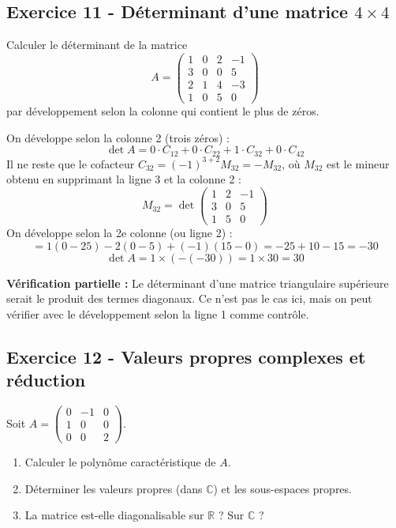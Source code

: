 \documentclass[12pt,a4paper]{article}
\begin{document}
\subsection*{Exercice 11 - Déterminant d'une matrice $4\times4$ \niveau{\difficile}}

\begin{boiteexercice}
Calculer le déterminant de la matrice
\[
A = \begin{pmatrix}1&0&2&-1\\3&0&0&5\\2&1&4&-3\\1&0&5&0\end{pmatrix}
\]
par développement selon la colonne qui contient le plus de zéros.
\end{boiteexercice}

\begin{boitecorrige}
On développe selon la colonne 2 (trois zéros) :
\[
\det A = 0\cdot C_{12} + 0\cdot C_{22} + 1\cdot C_{32} + 0\cdot C_{42}
\]
Il ne reste que le cofacteur $C_{32} = (-1)^{3+2}M_{32} = -M_{32}$, où $M_{32}$ est le mineur obtenu en supprimant la ligne 3 et la colonne 2 :
\[
M_{32} = \det\begin{pmatrix}1&2&-1\\3&0&5\\1&5&0\end{pmatrix}
\]
On développe selon la 2e colonne (ou ligne 2) :
\[
= 1(0-25) - 2(0-5) + (-1)(15-0) = -25+10-15 = -30
\]
\[
\det A = 1\times(-(-30)) = 1\times30 = 30
\]

\textbf{Vérification partielle :} Le déterminant d'une matrice triangulaire supérieure serait le produit des termes diagonaux. Ce n'est pas le cas ici, mais on peut vérifier avec le développement selon la ligne 1 comme contrôle.
\end{boitecorrige}

\subsection*{Exercice 12 - Valeurs propres complexes et réduction \niveau{\difficile}}

\begin{boiteexercice}
Soit $A = \begin{pmatrix}0&-1&0\\1&0&0\\0&0&2\end{pmatrix}$.
\begin{enumerate}
  \item Calculer le polynôme caractéristique de $A$.
  \item Déterminer les valeurs propres (dans $\mathbb{C}$) et les sous-espaces propres.
  \item La matrice est-elle diagonalisable sur $\mathbb{R}$ ? Sur $\mathbb{C}$ ?
\end{enumerate}
\end{boiteexercice}
\end{document}
